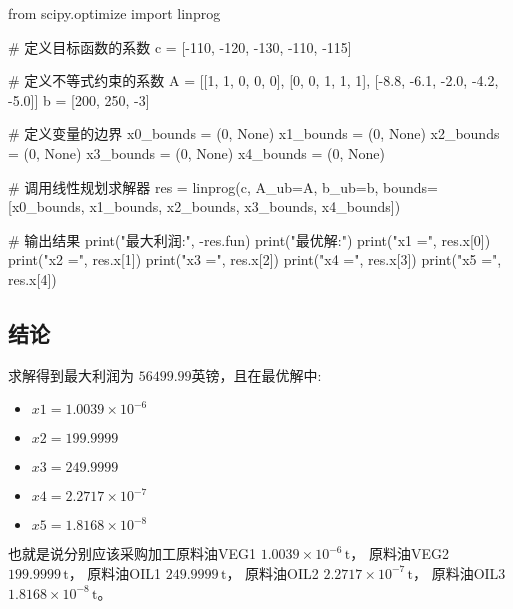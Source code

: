 \documentclass[a4,10pt,zihao=-4]{ctexart}
\begin{document}
\begin{python}
from scipy.optimize import linprog

# 定义目标函数的系数
c = [-110, -120, -130, -110, -115]

# 定义不等式约束的系数
A = [[1, 1, 0, 0, 0], [0, 0, 1, 1, 1], [-8.8, -6.1, -2.0, -4.2, -5.0]]
b = [200, 250, -3]

# 定义变量的边界
x0_bounds = (0, None)
x1_bounds = (0, None)
x2_bounds = (0, None)
x3_bounds = (0, None)
x4_bounds = (0, None)

# 调用线性规划求解器
res = linprog(c, A_ub=A, b_ub=b, bounds=[x0_bounds, x1_bounds, x2_bounds, x3_bounds, x4_bounds])

# 输出结果
print("最大利润:", -res.fun)
print("最优解:")
print("x1 =", res.x[0])
print("x2 =", res.x[1])
print("x3 =", res.x[2])
print("x4 =", res.x[3])
print("x5 =", res.x[4])

\end{python}


\subsection{结论}
求解得到最大利润为 $56499.99$英镑，且在最优解中:
\begin{itemize}
    \item $x1 = 1.0039\times 10^{-6}$
    \item $x2 = 199.9999$
    \item $x3 = 249.9999$
    \item $x4 = 2.2717\times 10^{-7}$
    \item $x5 = 1.8168\times 10^{-8}$
\end{itemize}

也就是说分别应该采购加工原料油VEG1 $1.0039\times 10^{-6}\,\text{t}$， 原料油VEG2 $199.9999\,\text{t}$， 原料油OIL1 $249.9999\,\text{t}$， 原料油OIL2 $2.2717\times 10^{-7}\,\text{t}$， 原料油OIL3 $1.8168\times 10^{-8}\,\text{t}$。
\end{document}
